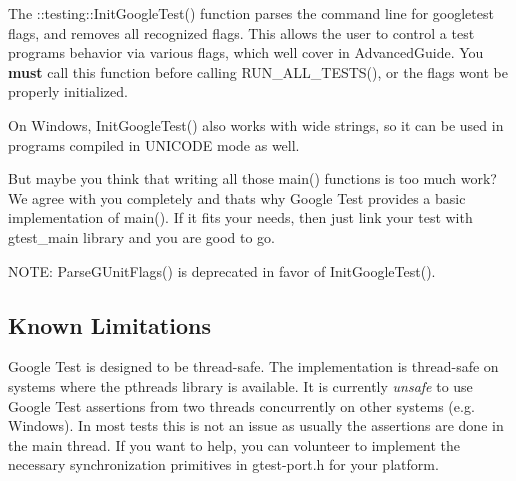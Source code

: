 The {\ttfamily \+::testing\+::\+Init\+Google\+Test()} function parses the command line for googletest flags, and removes all recognized flags. This allows the user to control a test program\textquotesingle{}s behavior via various flags, which we\textquotesingle{}ll cover in Advanced\+Guide. You {\bfseries must} call this function before calling {\ttfamily R\+U\+N\+\_\+\+A\+L\+L\+\_\+\+T\+E\+S\+T\+S()}, or the flags won\textquotesingle{}t be properly initialized.

On Windows, {\ttfamily Init\+Google\+Test()} also works with wide strings, so it can be used in programs compiled in {\ttfamily U\+N\+I\+C\+O\+DE} mode as well.

But maybe you think that writing all those main() functions is too much work? We agree with you completely and that\textquotesingle{}s why Google Test provides a basic implementation of main(). If it fits your needs, then just link your test with gtest\+\_\+main library and you are good to go.

N\+O\+TE\+: {\ttfamily Parse\+G\+Unit\+Flags()} is deprecated in favor of {\ttfamily Init\+Google\+Test()}.

\subsection*{Known Limitations}


\begin{DoxyItemize}
\item Google Test is designed to be thread-\/safe. The implementation is thread-\/safe on systems where the {\ttfamily pthreads} library is available. It is currently {\itshape unsafe} to use Google Test assertions from two threads concurrently on other systems (e.\+g. Windows). In most tests this is not an issue as usually the assertions are done in the main thread. If you want to help, you can volunteer to implement the necessary synchronization primitives in {\ttfamily gtest-\/port.\+h} for your platform. 
\end{DoxyItemize}